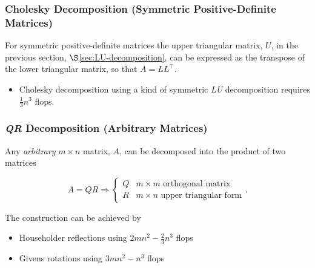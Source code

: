 \documentclass[12pt, twoside, draft]{article}
\begin{document}
\subsubsection{Cholesky Decomposition (Symmetric Positive-Definite Matrices)}\label{sec:cholesky-decomposition}
For symmetric positive-definite matrices the upper triangular matrix, $U$, in the previous section, $\S$\ref{sec:LU-decomposition}, can be expressed as the transpose of the lower triangular matrix, so that $A = LL^\top$.
\begin{itemize}
\item Cholesky decomposition using a kind of symmetric \textit{LU} decomposition requires $\frac{1}{3} n^3$ flops.
\end{itemize}

\subsubsection{\textit{QR} Decomposition (Arbitrary Matrices)}\label{sec:QR-decomposition}
Any \textit{arbitrary} $m \times n$ matrix, $A$, can be decomposed into the product of two matrices

\begin{equation}\label{eq:QR_decomposition}
A = QR \Rightarrow 
\begin{cases}
Q & m \times m \text{ orthogonal matrix} \\ 
R & m \times n \text{ upper triangular form}   
\end{cases} .
\end{equation}

The construction can be achieved by
\begin{itemize}
\item Householder reflections using $2mn^2 - \frac{2}{3}n^3$ flops
\item Givens rotations using $3mn^2 - n^3$ flops
\end{itemize}


%
%
\end{document}
